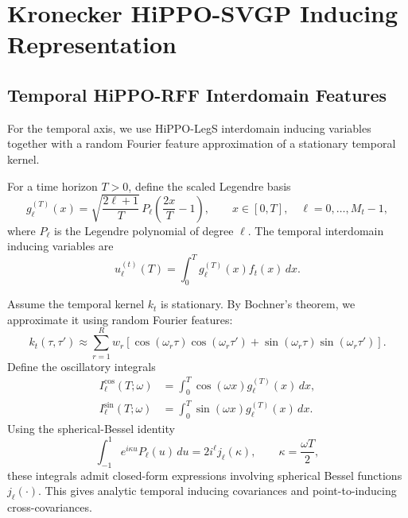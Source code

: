 \documentclass[12pt]{article}
\begin{document}
\section{Kronecker HiPPO-SVGP Inducing Representation}

\subsection{Temporal HiPPO-RFF Interdomain Features}

For the temporal axis, we use HiPPO-LegS interdomain inducing variables together with
a random Fourier feature approximation of a stationary temporal kernel.

For a time horizon $T>0$, define the scaled Legendre basis
\begin{equation}
g^{(T)}_\ell(x)
=
\sqrt{\frac{2\ell+1}{T}}\,
P_\ell\!\left(\frac{2x}{T}-1\right),
\qquad
x\in[0,T],
\quad
\ell=0,\dots,M_t-1,
\label{eq:scaled-legs-basis}
\end{equation}
where $P_\ell$ is the Legendre polynomial of degree $\ell$.
The temporal interdomain inducing variables are
\begin{equation}
u_\ell^{(t)}(T)
=
\int_0^T g_\ell^{(T)}(x) f_t(x)\,dx.
\label{eq:temporal-hippo-inducing}
\end{equation}

Assume the temporal kernel $k_t$ is stationary. By Bochner's theorem, we approximate it
using random Fourier features:
\begin{equation}
k_t(\tau,\tau')
\approx
\sum_{r=1}^{R} w_r
\left[
\cos(\omega_r\tau)\cos(\omega_r\tau')
+
\sin(\omega_r\tau)\sin(\omega_r\tau')
\right].
\label{eq:rff-kernel}
\end{equation}
Define the oscillatory integrals
\begin{align}
I^{\cos}_\ell(T;\omega)
&=
\int_0^T \cos(\omega x)g_\ell^{(T)}(x)\,dx,\\
I^{\sin}_\ell(T;\omega)
&=
\int_0^T \sin(\omega x)g_\ell^{(T)}(x)\,dx.
\end{align}
Using the spherical-Bessel identity
\begin{equation}
\int_{-1}^{1} e^{i\kappa u}P_\ell(u)\,du
=
2 i^\ell j_\ell(\kappa),
\qquad
\kappa=\frac{\omega T}{2},
\end{equation}
these integrals admit closed-form expressions involving spherical Bessel functions
$j_\ell(\cdot)$. This gives analytic temporal inducing covariances and point-to-inducing
cross-covariances.
\end{document}
